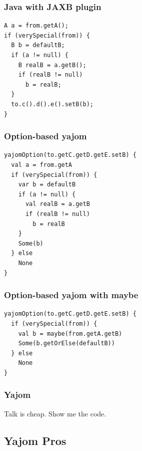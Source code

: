 \documentclass[14pt]{beamer}
\begin{document}
\begin{frame}[fragile]
\frametitle{Java with JAXB plugin}
\begin{lstlisting}
A a = from.getA();
if (verySpecial(from)) {
  B b = defaultB;
  if (a != null) {
    B realB = a.getB();
    if (realB != null)
      b = realB; 
  } 
  to.c().d().e().setB(b);
}
\end{lstlisting}
\end{frame}

\begin{frame}[fragile]
\frametitle{Option-based yajom}
\begin{lstlisting}
yajomOption(to.getC.getD.getE.setB) {
  val a = from.getA
  if (verySpecial(from)) {
    var b = defaultB
    if (a != null) {
      val realB = a.getB
      if (realB != null)
        b = realB
    }
    Some(b)
  } else
    None
}
\end{lstlisting}
\end{frame}

\begin{frame}[fragile]
\frametitle{Option-based yajom with maybe}
\begin{lstlisting}
yajomOption(to.getC.getD.getE.setB) {
  if (verySpecial(from)) {
    val b = maybe(from.getA.getB)
    Some(b.getOrElse(defaultB))
  } else
    None
}
\end{lstlisting}
\end{frame}

\frame
{\frametitle{Yajom}
\begin{center}
  \large Talk is cheap. Show me the code.
\end{center}
}

\subsection{Yajom Pros}
\end{document}
